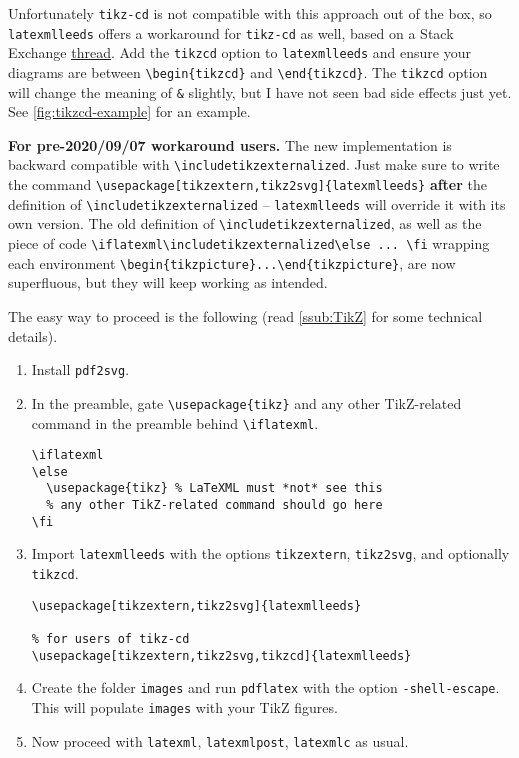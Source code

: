 \documentclass[a4paper]{article}
\def\ltxinline{\lstinline[style=latexml,frame=none]}
\theoremstyle{definition}
\begin{document}
Unfortunately \verb|tikz-cd| is not compatible with this approach out of the box, so \verb|latexmlleeds| offers a workaround for \verb|tikz-cd| as well, based on a Stack Exchange \href{https://tex.stackexchange.com/questions/171931/are-the-tikz-libraries-cd-and-external-incompatible-with-one-another#362104}{thread}. Add the \verb|tikzcd| option to \verb|latexmlleeds| and ensure your diagrams are between \ltxinline|\begin{tikzcd}| and \ltxinline|\end{tikzcd}|. The \verb|tikzcd| option will change the meaning of \ltxinline|&| slightly, but I have not seen bad side effects just yet. See \autoref{fig:tikzcd-example} for an example.

\textbf{For pre-2020/09/07 workaround users.} The new implementation is backward compatible with \ltxinline|\includetikzexternalized|. Just make sure to write the command \ltxinline|\usepackage[tikzextern,tikz2svg]{latexmlleeds}| \textbf{after} the definition of \ltxinline|\includetikzexternalized| -- \verb|latexmlleeds| will override it with its own version. The old definition of \ltxinline|\includetikzexternalized|, as well as the piece of code \ltxinline|\iflatexml\includetikzexternalized\else ... \fi| wrapping each environment \ltxinline|\begin{tikzpicture}...\end{tikzpicture}|, are now superfluous, but they will keep working as intended.

The easy way to proceed is the following (read \autoref{ssub:TikZ} for some technical details).
\begin{enumerate}
  \item Install \verb|pdf2svg|.
  \item In the preamble, gate \ltxinline|\usepackage{tikz}| and any other TikZ-related command in the preamble behind \ltxinline|\iflatexml|.
      \begin{lstlisting}[style=latexml]
\iflatexml
\else
  \usepackage{tikz} % LaTeXML must *not* see this
  % any other TikZ-related command should go here
\fi
      \end{lstlisting}
  \item  Import \ltxinline|latexmlleeds| with the options \ltxinline|tikzextern|, \ltxinline|tikz2svg|, and optionally \ltxinline|tikzcd|.
  \begin{lstlisting}[style=latexml]
% for most users
\usepackage[tikzextern,tikz2svg]{latexmlleeds}

% for users of tikz-cd
\usepackage[tikzextern,tikz2svg,tikzcd]{latexmlleeds}
  \end{lstlisting}
  \item Create the folder \verb|images| and run \verb|pdflatex| with the option \verb|-shell-escape|. This will populate \verb|images| with your TikZ figures.
  \item Now proceed with \verb|latexml|, \verb|latexmlpost|, \verb|latexmlc| as usual.
\end{enumerate}
\end{document}

